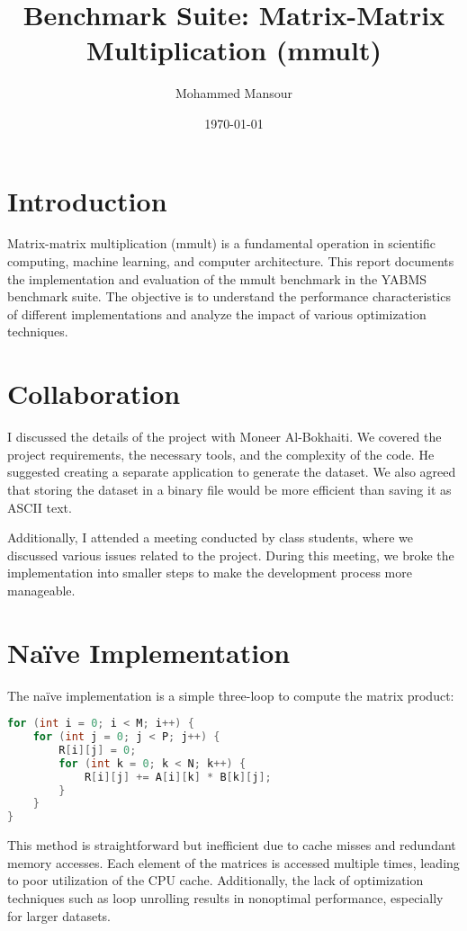 \documentclass[12pt]{article}
\title{Benchmark Suite: Matrix-Matrix Multiplication (mmult)}
\author{Mohammed Mansour}
\date{\today}
\begin{document}
\maketitle

\section{Introduction}
Matrix-matrix multiplication (mmult) is a fundamental operation in scientific computing, machine learning, and computer architecture. This report documents the implementation and evaluation of the mmult benchmark in the YABMS benchmark suite. The objective is to understand the performance characteristics of different implementations and analyze the impact of various optimization techniques.

\section{Collaboration}
I discussed the details of the project with Moneer Al-Bokhaiti. We covered the project requirements, the necessary tools, and the complexity of the code. He suggested creating a separate application to generate the dataset. We also agreed that storing the dataset in a binary file would be more efficient than saving it as ASCII text.

Additionally, I attended a meeting conducted by class students, where we discussed various issues related to the project. During this meeting, we broke the implementation into smaller steps to make the development process more manageable.

\section{Naïve Implementation}
The naïve implementation is a simple three-loop to compute the matrix product:
\begin{lstlisting}[language=C, style=customc, caption=Naïve mmult implementation]
for (int i = 0; i < M; i++) {
    for (int j = 0; j < P; j++) {
        R[i][j] = 0;
        for (int k = 0; k < N; k++) {
            R[i][j] += A[i][k] * B[k][j];
        }
    }
}
\end{lstlisting}

This method is straightforward but inefficient due to cache misses and redundant memory accesses. Each element of the matrices is accessed multiple times, leading to poor utilization of the CPU cache. Additionally, the lack of optimization techniques such as loop unrolling results in nonoptimal performance, especially for larger datasets.
\end{document}

